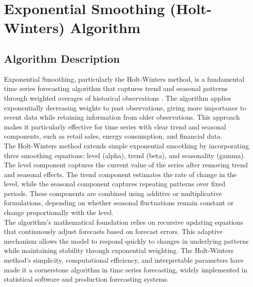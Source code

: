 %
%
%

\chapter{Exponential Smoothing (Holt-Winters) Algorithm}
\label{ch:exponentialsmoothing}

\section{Algorithm Description}
\label{sec:algorithm_description}

Exponential Smoothing, particularly the Holt-Winters method, is a fundamental time series forecasting algorithm that captures trend and seasonal patterns through weighted averages of historical observations \cite{Winters:1960}. The algorithm applies exponentially decreasing weights to past observations, giving more importance to recent data while retaining information from older observations. This approach makes it particularly effective for time series with clear trend and seasonal components, such as retail sales, energy consumption, and financial data.\\

The Holt-Winters method extends simple exponential smoothing by incorporating three smoothing equations: level (alpha), trend (beta), and seasonality (gamma). The level component captures the current value of the series after removing trend and seasonal effects. The trend component estimates the rate of change in the level, while the seasonal component captures repeating patterns over fixed periods. These components are combined using additive or multiplicative formulations, depending on whether seasonal fluctuations remain constant or change proportionally with the level.\\

The algorithm's mathematical foundation relies on recursive updating equations that continuously adjust forecasts based on forecast errors. This adaptive mechanism allows the model to respond quickly to changes in underlying patterns while maintaining stability through exponential weighting. The Holt-Winters method's simplicity, computational efficiency, and interpretable parameters have made it a cornerstone algorithm in time series forecasting, widely implemented in statistical software and production forecasting systems.


